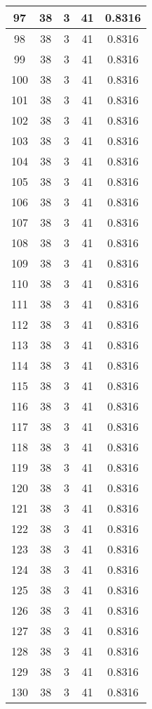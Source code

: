 \documentclass[letterpaper, 12pt]{article}
\begin{document}
\begin{longtable}{|c|c|c|c|c|}
\hline
97 & 38 & 3 & 41 & 0.8316 \\
\hline
98 & 38 & 3 & 41 & 0.8316 \\
\hline
99 & 38 & 3 & 41 & 0.8316 \\
\hline
100 & 38 & 3 & 41 & 0.8316 \\
\hline
101 & 38 & 3 & 41 & 0.8316 \\
\hline
102 & 38 & 3 & 41 & 0.8316 \\
\hline
103 & 38 & 3 & 41 & 0.8316 \\
\hline
104 & 38 & 3 & 41 & 0.8316 \\
\hline
105 & 38 & 3 & 41 & 0.8316 \\
\hline
106 & 38 & 3 & 41 & 0.8316 \\
\hline
107 & 38 & 3 & 41 & 0.8316 \\
\hline
108 & 38 & 3 & 41 & 0.8316 \\
\hline
109 & 38 & 3 & 41 & 0.8316 \\
\hline
110 & 38 & 3 & 41 & 0.8316 \\
\hline
111 & 38 & 3 & 41 & 0.8316 \\
\hline
112 & 38 & 3 & 41 & 0.8316 \\
\hline
113 & 38 & 3 & 41 & 0.8316 \\
\hline
114 & 38 & 3 & 41 & 0.8316 \\
\hline
115 & 38 & 3 & 41 & 0.8316 \\
\hline
116 & 38 & 3 & 41 & 0.8316 \\
\hline
117 & 38 & 3 & 41 & 0.8316 \\
\hline
118 & 38 & 3 & 41 & 0.8316 \\
\hline
119 & 38 & 3 & 41 & 0.8316 \\
\hline
120 & 38 & 3 & 41 & 0.8316 \\
\hline
121 & 38 & 3 & 41 & 0.8316 \\
\hline
122 & 38 & 3 & 41 & 0.8316 \\
\hline
123 & 38 & 3 & 41 & 0.8316 \\
\hline
124 & 38 & 3 & 41 & 0.8316 \\
\hline
125 & 38 & 3 & 41 & 0.8316 \\
\hline
126 & 38 & 3 & 41 & 0.8316 \\
\hline
127 & 38 & 3 & 41 & 0.8316 \\
\hline
128 & 38 & 3 & 41 & 0.8316 \\
\hline
129 & 38 & 3 & 41 & 0.8316 \\
\hline
130 & 38 & 3 & 41 & 0.8316 \\

\end{longtable}
\end{document}
